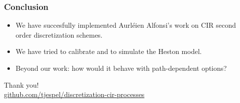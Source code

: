 \documentclass[12pt]{beamer}
\begin{document}
\begin{frame}
\frametitle{Conclusion}
\begin{itemize}
  \item We have succesfully implemented Aurléien Alfonsi's work on CIR second order discretization schemes.
  \item We have tried to calibrate and to simulate the Heston model.
  \item Beyond our work: how would it behave with path-dependent options?
\end{itemize}
\end{frame}


\begin{frame}
\centering
{\Large Thank you!}
\\[1cm]
{\small\url{github.com/tjespel/discretization-cir-processes}}
\end{frame}
\end{document}
